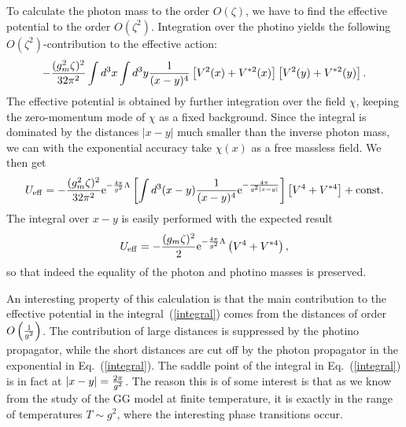 \documentclass[a4paper,12pt]{article}
\begin{document}
To calculate the photon mass to the order $O(\zeta)$, we have to
find the effective potential to the order $O(\zeta^2)$.
Integration over the photino yields the following
$O(\zeta^2)$-contribution to the effective action:
\begin{equation}
-\frac{(g_m^2\zeta)^2}{32\pi^2}\int d^3x\int
d^3y{1\over(x-y)^4}\left[V^2(x)+V^{*2}(x)\right]\left[V^2(y)+V^{*2}(y)\right].
\end{equation}
The effective potential is obtained by further integration over
the field $\chi$, keeping the zero-momentum mode of $\chi$ as a
fixed background. Since the integral is dominated by the distances
$|x-y|$ much smaller than the inverse photon mass, we can with the
exponential accuracy take $\chi(x)$ as a free massless field. We
then get
\begin{equation}
U_{\rm eff}=-\frac{(g_m^2\zeta)^2}{32\pi^2}{\rm e}^{-{4\pi\over
g^2}\Lambda}\left[\int d^3(x-y){1\over(x-y)^4}{\rm e}^{-{4\pi\over g^2
|x-y|}}\right]\left[V^4+V^{*4}\right]+{\rm const.}
\label{integral}\end{equation} The integral over $x-y$ is easily
performed with the expected result
\begin{equation}
U_{\rm eff}=-{(g_m\zeta )^2\over 2}{\rm e}^{-{4\pi\over
g^2}\Lambda}\left(V^4+V^{*4}\right),
\end{equation}
so that indeed the equality of the photon and photino masses is
preserved.

An interesting property of this calculation is that the main
contribution to the effective potential in the integral~(\ref{integral})
comes from the distances of order $O\left({1\over
g^2}\right)$. The contribution of large distances is suppressed by
the photino propagator, while the short distances are cut off by
the photon propagator in the exponential in Eq.~(\ref{integral}).
The saddle point of the integral in Eq.~(\ref{integral}) is in fact
at $|x-y|={2\pi\over g^2}$. The reason this is of some interest
is that as we know from the study of the GG model at
finite temperature, it is exactly in the range of temperatures
$T\sim g^2$, where the interesting phase transitions occur.
\end{document}
